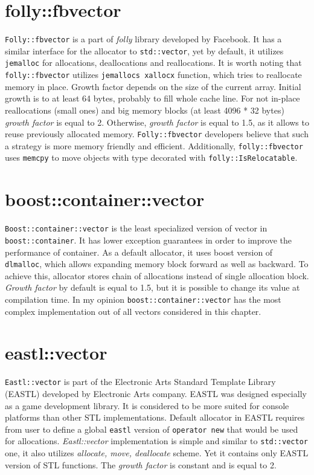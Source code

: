 \documentclass[inz, english, shortabstract]{iithesis}
\begin{document}
\section{folly::fbvector}
{\tt Folly::fbvector}\cite{folly::fbvector_impl} is a part of \emph{folly} library developed by Facebook. It has a similar interface for the allocator to {\tt std::vector}, yet by default, it utilizes {\tt jemalloc} for allocations, deallocations and reallocations\cite{folly::fbvector_description}. It is worth noting that {\tt folly::fbvector} utilizes {\tt jemallocs xallocx} function, which tries to reallocate memory in place. Growth factor depends on the size of the current array. Initial growth is to at least 64 bytes, probably to fill whole cache line. For not in-place reallocations (small ones) and big memory blocks (at least 4096 * 32 bytes) \emph{growth factor} is equal to 2. Otherwise, \emph{growth factor} is equal to 1.5, as it allows to reuse previously allocated memory. {\tt Folly::fbvector} developers believe that such a strategy is more memory friendly and efficient\cite{folly::fbvector_description}. Additionally, {\tt folly::fbvector} uses {\tt memcpy} to move objects with type decorated with {\tt folly::IsRelocatable}.

\section{boost::container::vector}
{\tt Boost::container::vector}\cite{boost::container::vector_impl} is the least specialized version of vector in {\tt boost::container}. It has lower exception guarantees in order to improve the performance of container\cite{boost_exceptions}. As a default allocator, it uses boost version of {\tt dlmalloc}\cite{dlmalloc}, which allows expanding memory block forward as well as backward. To achieve this, allocator stores chain of allocations instead of single allocation block. \emph{Growth factor} by default is equal to 1.5, but it is possible to change its value at compilation time. In my opinion {\tt boost::container::vector} has the most complex implementation out of all vectors considered in this chapter.

\section{eastl::vector}
{\tt Eastl::vector}\cite{eastl::vector_impl} is part of the Electronic Arts Standard Template Library (EASTL) developed by Electronic Arts company. EASTL was designed especially as a game development library. It is considered to be more suited for console platforms\cite{eastl_faq} than other STL implementations. Default allocator in EASTL requires from user to define a global {\tt eastl} version of {\tt operator new} that would be used for allocations. {\it Eastl::vector} implementation is simple and similar to {\tt std::vector} one, it also utilizes \emph{allocate, move, deallocate} scheme. Yet it contains only EASTL version of STL functions. The \emph{growth factor} is constant and is equal to 2.  
\end{document}
